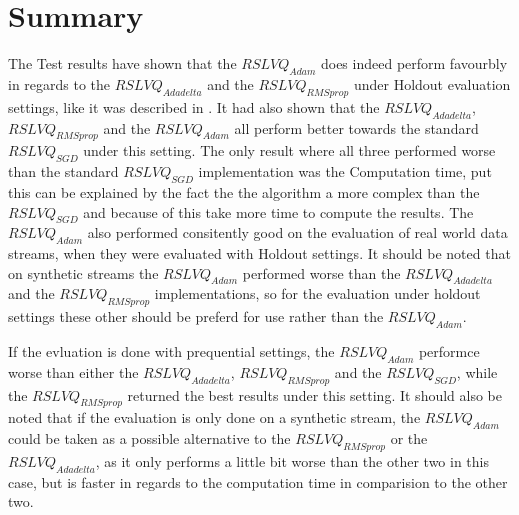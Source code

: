 \documentclass[12pt,oneside,a4paper,parskip]{scrbook}
\begin{document}
\chapter{Summary}
The Test results have shown that the $RSLVQ_\textit{Adam}$ does indeed perform favourbly in regards to the $RSLVQ_\textit{Adadelta}$ and the
$RSLVQ_\textit{RMSprop}$ under Holdout evaluation settings, like it was described in \cite{Kingma2014AdamAM}.
It had also shown that the $RSLVQ_\textit{Adadelta}$, $RSLVQ_\textit{RMSprop}$ and the $RSLVQ_\textit{Adam}$ all perform better
towards the standard $RSLVQ_\textit{SGD}$ under this setting.
The only result where all three performed worse than the standard $RSLVQ_\textit{SGD}$ implementation was the Computation time,
put this can be explained by the fact the the algorithm a more complex than the $RSLVQ_\textit{SGD}$ and because of this take more time
to compute the results.
The $RSLVQ_\textit{Adam}$ also performed consitently good on the evaluation of real world data streams, when they were evaluated with 
Holdout settings.
It should be noted that on synthetic streams the $RSLVQ_\textit{Adam}$ performed worse than the $RSLVQ_\textit{Adadelta}$ and the $RSLVQ_\textit{RMSprop}$
implementations, so for the evaluation under holdout settings these other should be preferd for use rather than the $RSLVQ_\textit{Adam}$.

If the evluation is done with prequential settings, the $RSLVQ_\textit{Adam}$ performce worse than either the $RSLVQ_\textit{Adadelta}$, $RSLVQ_\textit{RMSprop}$
and the $RSLVQ_\textit{SGD}$, while the $RSLVQ_\textit{RMSprop}$ returned the best results under this setting.
It should also be noted that if the evaluation is only done on a synthetic stream, the $RSLVQ_\textit{Adam}$ could be taken as a 
possible alternative to the $RSLVQ_\textit{RMSprop}$ or the $RSLVQ_\textit{Adadelta}$, as it only performs a little bit worse than the other two in this case,
but is faster in regards to the computation time in comparision to the other two.

\backmatter

\printacronyms[include-classes=abbrev,name=Abbreviations]


\listoffigures
{}			

\listoftables
\end{document}
